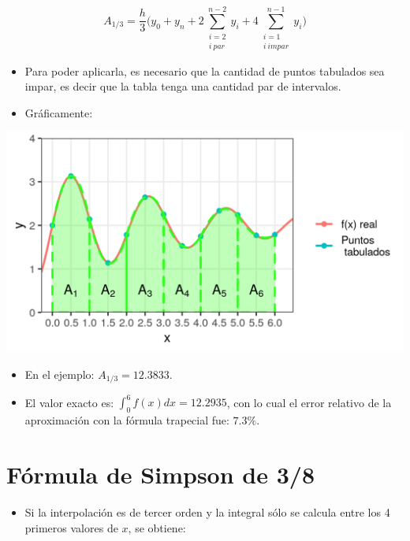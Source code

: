 \documentclass[openany]{book}
\providecommand{\tightlist}{%
  \setlength{\itemsep}{0pt}\setlength{\parskip}{0pt}}
\begin{document}
\[
A_{1/3} = \frac{h}{3} \Big( y_0 + y_n + 2 \sum \limits_{\substack{i = 2\\ i~par}}^{n-2} y_i + 4 \sum\limits_{\substack{i = 1\\ i~impar}}^{n-1} y_i  \Big)
\]

\begin{itemize}
\item
  Para poder aplicarla, es necesario que la cantidad de puntos tabulados sea impar, es decir que la tabla tenga una cantidad par de intervalos.
\item
  Gráficamente:
\end{itemize}

\begin{center}\includegraphics[width=0.85\linewidth]{Plots/U4/Unidad4_2_g7} \end{center}

\begin{itemize}
\tightlist
\item
  En el ejemplo: \(A_{1/3} = 12.3833\).
\item
  El valor exacto es: \(\int_0^{6}f(x)dx = 12.2935\), con lo cual el error relativo de la aproximación con la fórmula trapecial fue: \(7.3\%\).
\end{itemize}

\hypertarget{fuxf3rmula-de-simpson-de-38}{%
\section{Fórmula de Simpson de 3/8}\label{fuxf3rmula-de-simpson-de-38}}

\begin{itemize}
\tightlist
\item
  Si la interpolación es de tercer orden y la integral sólo se calcula entre los 4 primeros valores de \(x\), se obtiene:
\end{itemize}
\end{document}

